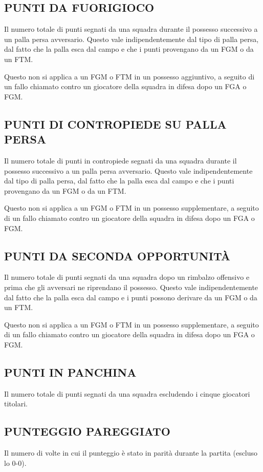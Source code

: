 \subsection*{PUNTI DA FUORIGIOCO}
\subsectionline
Il numero totale di punti segnati da una squadra durante il possesso successivo a un palla persa avversario. Questo vale indipendentemente dal tipo di palla persa, dal fatto che la palla esca dal campo e che i punti provengano da un FGM o da un FTM.

Questo non si applica a un FGM o FTM in un possesso aggiuntivo, a seguito di un fallo chiamato contro un giocatore della squadra in difesa dopo un FGA o FGM.

\subsection*{PUNTI DI CONTROPIEDE SU PALLA PERSA}
\subsectionline
Il numero totale di punti in contropiede segnati da una squadra durante il possesso successivo a un palla persa avversario. Questo vale indipendentemente dal tipo di palla persa, dal fatto che la palla esca dal campo e che i punti provengano da un FGM o da un FTM.

Questo non si applica a un FGM o FTM in un possesso supplementare, a seguito di un fallo chiamato contro un giocatore della squadra in difesa dopo un FGA o FGM.

\subsection*{PUNTI DA SECONDA OPPORTUNITÀ}
\subsectionline
Il numero totale di punti segnati da una squadra dopo un rimbalzo offensivo e prima che gli avversari ne riprendano il possesso. Questo vale indipendentemente dal fatto che la palla esca dal campo e i punti possono derivare da un FGM o da un FTM.

Questo non si applica a un FGM o FTM in un possesso supplementare, a seguito di un fallo chiamato contro un giocatore della squadra in difesa dopo un FGA o FGM.

\subsection*{PUNTI IN PANCHINA}
\subsectionline
Il numero totale di punti segnati da una squadra escludendo i cinque giocatori titolari.

\subsection*{PUNTEGGIO PAREGGIATO}
\subsectionline
Il numero di volte in cui il punteggio è stato in parità durante la partita (escluso lo 0-0).

